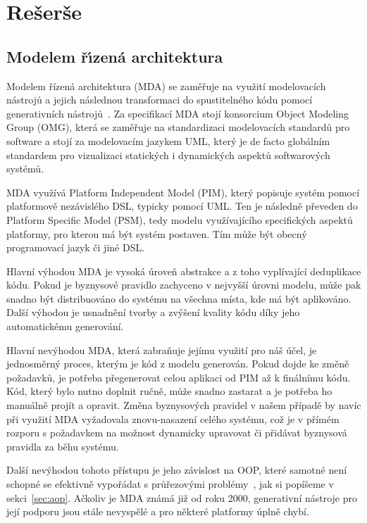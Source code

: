 
\chapter{Rešerše}\label{ch:reserse}


\section{Modelem ř\'{\i}zená architektura}

Modelem řízená architektura (\gls{MDA}) se zaměřuje na využití
modelovacích nástrojů a jejich následnou transformaci do
spustitelného kódu pomocí generativních nástrojů~\cite{soley2000model}.
Za specifikací \gls{MDA} stojí konsorcium Object Modeling Group (\gls{OMG}),
která se zaměřuje na standardizaci modelovacích standardů pro software
a stojí za modelovacím jazykem \gls{UML}, který je de facto globálním standardem
pro vizualizaci statických i dynamických aspektů softwarových systémů.

\gls{MDA} využívá Platform Independent Model (\gls{PIM}),
který popisuje systém pomocí platformově nezávislého \gls{DSL},
typicky pomocí \gls{UML}. Ten je následně převeden do
Platform Specific Model (\gls{PSM}), tedy modelu využívajícího
specifických aspektů platformy, pro kterou má být systém postaven.
Tím může být obecný programovací jazyk či jiné \gls{DSL}.

Hlavní výhodou \gls{MDA} je vysoká úroveň abstrakce a z toho vyplívající
deduplikace kódu. Pokud je byznysové pravidlo zachyceno v nejvyšší
úrovni modelu, může pak snadno být distribuováno do systému na všechna
místa, kde má být aplikováno. Další výhodou je usnadnění tvorby a zvýšení
kvality kódu díky jeho automatickému generování.

Hlavní nevýhodou \gls{MDA}, která zabraňuje jejímu využití
pro náš účel, je jednosměrný proces, kterým je kód z modelu
generován. Pokud dojde ke změně požadavků, je potřeba přegenerovat
celou aplikaci od \gls{PIM} až k finálnímu kódu. Kód, který bylo
nutno doplnit ručně, může snadno zastarat a je potřeba ho manuálně
projít a opravit. Změna byznysových pravidel v našem případě by
navíc při využití \gls{MDA} vyžadovala znovu-nasazení celého
systému, což je v přímém rozporu s požadavkem na možnost dynamicky
upravovat či přidávat byznysová pravidla za běhu systému.

Další nevýhodou tohoto přístupu je jeho závislost na \gls{OOP},
které samotné není schopné se efektivně vypořádat s průřezovými
problémy~\cite{cemus2014aspect}, jak si popíšeme v sekci~\ref{sec:aop}.
Ačkoliv je \gls{MDA} známá již od roku 2000, generativní nástroje pro
její podporu jsou stále nevyspělé a pro některé platformy úplně chybí.

